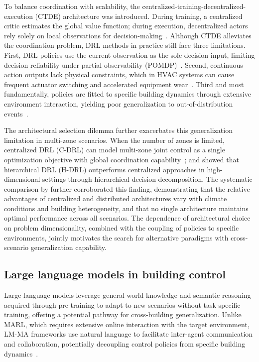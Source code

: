 \documentclass[a4paper]{cas-sc}
\begin{document}
To balance coordination with scalability, the centralized-training-decentralized-execution (CTDE) architecture was introduced. During training, a centralized critic estimates the global value function; during execution, decentralized actors rely solely on local observations for decision-making~\cite{Lee2020-dx,Jendoubi2023-ak}. Although CTDE alleviates the coordination problem, DRL methods in practice still face three limitations. First, DRL policies use the current observation as the sole decision input, limiting decision reliability under partial observability (POMDP)~\cite{Jendoubi2023-ak}. Second, continuous action outputs lack physical constraints, which in HVAC systems can cause frequent actuator switching and accelerated equipment wear~\cite{Wang2024-sk}. Third and most fundamentally, policies are fitted to specific building dynamics through extensive environment interaction, yielding poor generalization to out-of-distribution events~\cite{Fang2023-iz}.

The architectural selection dilemma further exacerbates this generalization limitation in multi-zone scenarios. When the number of zones is limited, centralized DRL (C-DRL) can model multi-zone joint control as a single optimization objective with global coordination capability~\cite{Savino2025-tt}; \citet{Zhou2025-ob} and \citet{Dai2026-qs} showed that hierarchical DRL (H-DRL) outperforms centralized approaches in high-dimensional settings through hierarchical decision decomposition. The systematic comparison by \citet{Pinto2022-bn} further corroborated this finding, demonstrating that the relative advantages of centralized and distributed architectures vary with climate conditions and building heterogeneity, and that no single architecture maintains optimal performance across all scenarios. The dependence of architectural choice on problem dimensionality, combined with the coupling of policies to specific environments, jointly motivates the search for alternative paradigms with cross-scenario generalization capability.

\subsection{Large language models in building control}

Large language models leverage general world knowledge and semantic reasoning acquired through pre-training to adapt to new scenarios without task-specific training, offering a potential pathway for cross-building generalization. Unlike MARL, which requires extensive online interaction with the target environment, LM-MA frameworks use natural language to facilitate inter-agent communication and collaboration, potentially decoupling control policies from specific building dynamics~\cite{Liu2025-ql,Sun2024-ig}.
\end{document}
